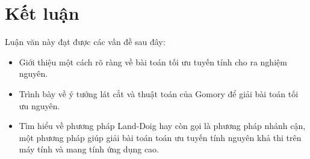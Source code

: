 \documentclass[12pt,a4paper]{report}
\begin{document}
\chapter*{Kết luận}                         %
\indent
\thispagestyle{fancy}

Luận văn này đạt được các vấn đề sau đây:

\begin{itemize}
    \item Giới thiệu một cách rõ ràng về bài toán tối ưu tuyến tính cho ra nghiệm nguyên.
    \item Trình bày về ý tưởng lát cắt và thuật toán của Gomory để giải bài toán tối ưu nguyên.
	\item Tìm hiểu về phương pháp Land-Doig hay còn gọi là phương pháp nhánh cận, một phương pháp giúp giải bài toán toán ưu tuyến tính nguyên khả thi trên máy tính và mang tính ứng dụng cao.
\end{itemize}
\nocite{*}


\end{document}
